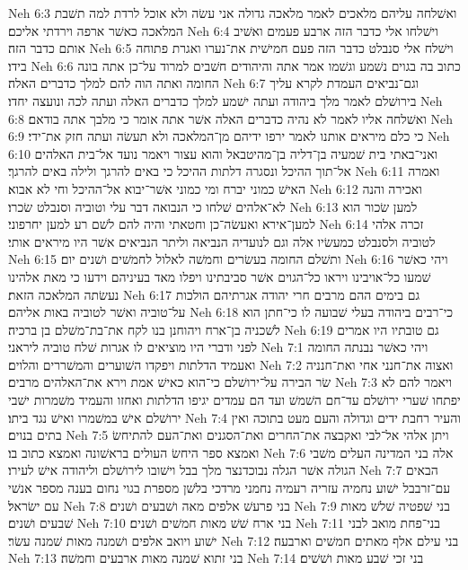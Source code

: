 Neh 6:3  ואשׁלחה עליהם מלאכים לאמר מלאכה גדולה אני עשׂה ולא אוכל לרדת למה תשׁבת המלאכה כאשׁר ארפה וירדתי אליכם׃
Neh 6:4  וישׁלחו אלי כדבר הזה ארבע פעמים ואשׁיב אותם כדבר הזה׃
Neh 6:5  וישׁלח אלי סנבלט כדבר הזה פעם חמישׁית את־נערו ואגרת פתוחה בידו׃
Neh 6:6  כתוב בה בגוים נשׁמע וגשׁמו אמר אתה והיהודים חשׁבים למרוד על־כן אתה בונה החומה ואתה הוה להם למלך כדברים האלה׃
Neh 6:7  וגם־נביאים העמדת לקרא עליך בירושׁלם לאמר מלך ביהודה ועתה ישׁמע למלך כדברים האלה ועתה לכה ונועצה יחדו׃
Neh 6:8  ואשׁלחה אליו לאמר לא נהיה כדברים האלה אשׁר אתה אומר כי מלבך אתה בודאם׃
Neh 6:9  כי כלם מיראים אותנו לאמר ירפו ידיהם מן־המלאכה ולא תעשׂה ועתה חזק את־ידי׃
Neh 6:10  ואני־באתי בית שׁמעיה בן־דליה בן־מהיטבאל והוא עצור ויאמר נועד אל־בית האלהים אל־תוך ההיכל ונסגרה דלתות ההיכל כי באים להרגך ולילה באים להרגך׃
Neh 6:11  ואמרה האישׁ כמוני יברח ומי כמוני אשׁר־יבוא אל־ההיכל וחי לא אבוא׃
Neh 6:12  ואכירה והנה לא־אלהים שׁלחו כי הנבואה דבר עלי וטוביה וסנבלט שׂכרו׃
Neh 6:13  למען שׂכור הוא למען־אירא ואעשׂה־כן וחטאתי והיה להם לשׁם רע למען יחרפוני׃
Neh 6:14  זכרה אלהי לטוביה ולסנבלט כמעשׂיו אלה וגם לנועדיה הנביאה וליתר הנביאים אשׁר היו מיראים אותי׃
Neh 6:15  ותשׁלם החומה בעשׂרים וחמשׁה לאלול לחמשׁים ושׁנים יום׃
Neh 6:16  ויהי כאשׁר שׁמעו כל־אויבינו ויראו כל־הגוים אשׁר סביבתינו ויפלו מאד בעיניהם וידעו כי מאת אלהינו נעשׂתה המלאכה הזאת׃
Neh 6:17  גם בימים ההם מרבים חרי יהודה אגרתיהם הולכות על־טוביה ואשׁר לטוביה באות אליהם׃
Neh 6:18  כי־רבים ביהודה בעלי שׁבועה לו כי־חתן הוא לשׁכניה בן־ארח ויהוחנן בנו לקח את־בת־משׁלם בן ברכיה׃
Neh 6:19  גם טובתיו היו אמרים לפני ודברי היו מוציאים לו אגרות שׁלח טוביה ליראני׃
Neh 7:1  ויהי כאשׁר נבנתה החומה ואעמיד הדלתות ויפקדו השׁוערים והמשׁררים והלוים׃
Neh 7:2  ואצוה את־חנני אחי ואת־חנניה שׂר הבירה על־ירושׁלם כי־הוא כאישׁ אמת וירא את־האלהים מרבים׃
Neh 7:3  ויאמר להם לא יפתחו שׁערי ירושׁלם עד־חם השׁמשׁ ועד הם עמדים יגיפו הדלתות ואחזו והעמיד משׁמרות ישׁבי ירושׁלם אישׁ במשׁמרו ואישׁ נגד ביתו׃
Neh 7:4  והעיר רחבת ידים וגדולה והעם מעט בתוכה ואין בתים בנוים׃
Neh 7:5  ויתן אלהי אל־לבי ואקבצה את־החרים ואת־הסגנים ואת־העם להתיחשׂ ואמצא ספר היחשׂ העולים בראשׁונה ואמצא כתוב בו׃
Neh 7:6  אלה בני המדינה העלים משׁבי הגולה אשׁר הגלה נבוכדנצר מלך בבל וישׁובו לירושׁלם וליהודה אישׁ לעירו׃
Neh 7:7  הבאים עם־זרבבל ישׁוע נחמיה עזריה רעמיה נחמני מרדכי בלשׁן מספרת בגוי נחום בענה מספר אנשׁי עם ישׂראל׃
Neh 7:8  בני פרעשׁ אלפים מאה ושׁבעים ושׁנים׃
Neh 7:9  בני שׁפטיה שׁלשׁ מאות שׁבעים ושׁנים׃
Neh 7:10  בני ארח שׁשׁ מאות חמשׁים ושׁנים׃
Neh 7:11  בני־פחת מואב לבני ישׁוע ויואב אלפים ושׁמנה מאות שׁמנה עשׂר׃
Neh 7:12  בני עילם אלף מאתים חמשׁים וארבעה׃
Neh 7:13  בני זתוא שׁמנה מאות ארבעים וחמשׁה׃
Neh 7:14  בני זכי שׁבע מאות ושׁשׁים׃
